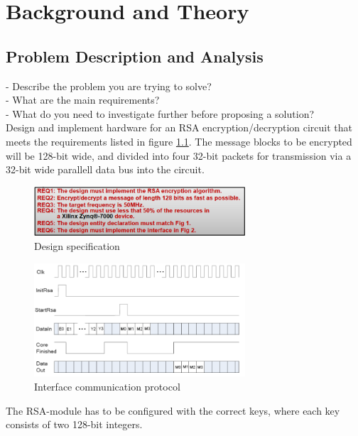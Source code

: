 \chapter{Background and Theory}
\section{Problem Description and Analysis} %

- Describe the problem you are trying to solve?\\
- What are the main requirements?\\
- What do you need to investigate further before proposing a solution?\\

Design and implement hardware for an RSA encryption/decryption circuit that meets the requirements listed in figure \ref{fig:req}. The message blocks to be encrypted will be 128-bit wide, and divided into four 32-bit packets for transmission via a 32-bit wide parallell data bus into the circuit.
\begin{figure}[H]
\centering
\includegraphics[width=0.7\textwidth]{images/requierements.PNG}
\caption{Design specification}
\label{fig:req}
\end{figure}
\begin{figure}[H]
\centering
\includegraphics[width=0.7\textwidth]{images/communication.PNG}
\caption{Interface communication protocol}
\label{fig:interface}
\end{figure}
The RSA-module has to be configured with the correct keys, where each key consists of two 128-bit integers.


